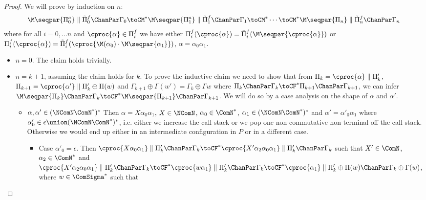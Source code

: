 \begin{proof}
We will prove by induction on $n$: 
$$\M\seqpar{\Pi^a_0} \parallel \tilde{\Pi}^f_0 \ChanPar \Gamma_0 \toCM^* \M\seqpar{\Pi^a_1} \parallel \tilde{\Pi}^f_1 \ChanPar \Gamma_1 \toCM^* \cdots \toCM^* \M\seqpar{\Pi_n} \parallel \tilde{\Pi}^f_n \ChanPar \Gamma_n$$
where for all $i = 0,\ldots n$ and $\cproc{\alpha} \in \Pi_i^f$ we have either $\Pi_i^f(\cproc{\alpha}) = \tilde{\Pi}^f_i(\M\seqpar{\cproc{\alpha}})$ or $\Pi_i^f(\cproc{\alpha}) = \tilde{\Pi}^f_i(\cproc{\M(\alpha_0) \cdot \M\seqpar{\alpha_1}})$, $\alpha = \alpha_0\alpha_1$.
\begin{itemize}
	\item $n = 0$. \newline
	The claim holds trivially.
	\item $n = k+1$, assuming the claim holds for $k$. \newline
	To prove the inductive claim we need to show that from
	$\Pi_k = \cproc{\alpha} \parallel \Pi'_k$, $\Pi_{k+1} =\cproc{\alpha'} \parallel \Pi'_k \oplus \Pi(w)$
	and
	$\Gamma_{k+1} \oplus \Gamma(w') = \Gamma_k \oplus \Gamma{w}$
	where $\Pi_k \ChanPar \Gamma_k \toCF^* \Pi_{k+1} \ChanPar \Gamma_{k+1}$,
	we can infer $\M\seqpar{\Pi_k} \ChanPar \Gamma_k \toCF^* \M\seqpar{\Pi_{k+1}} \ChanPar \Gamma_{k+1}$.
	We will do so by a case analysis on the shape of $\alpha$ and $\alpha'$.
	\begin{itemize}
		\item $\alpha, \alpha' \in (\NComN\ComN^*)^*$ \newline
		Then $\alpha = X\alpha_0\alpha_1$, $X \in \NComN$, $\alpha_0 \in \ComN^*$, 
		$\alpha_1 \in (\NComN\ComN^*)^*$ and $\alpha' = \alpha'_0\alpha_1$ where $\alpha'_0 \in \epsilon \union (\NComN\ComN^*)^*$, i.e. either we increase the call-stack or we pop one non-commutative non-terminal off the call-stack. Otherwise we would end up either in an intermediate configuration in $P$ or in a different case.
		\begin{itemize}
			\item Case $\alpha'_0 = \epsilon$.\newline
			Then $\cproc{X\alpha_0\alpha_1} \parallel \Pi'_k \ChanPar \Gamma_k \toCF^* 
				\cproc{X'\alpha_2\alpha_0\alpha_1} \parallel \Pi'_k \ChanPar \Gamma_k$ such that 
				${X' \in \ComN}$, $\alpha_2 \in \ComN^*$ and 
				$\cproc{X'\alpha_2\alpha_0\alpha_1} \parallel \Pi'_k \ChanPar \Gamma_k \toCF^*
					\cproc{w\alpha_1} \parallel \Pi'_k \ChanPar \Gamma_k \toCF^* 
					\cproc{\alpha_1} \parallel \Pi'_k \oplus \Pi(w) \ChanPar \Gamma_k \oplus \Gamma(w)$, where $w \in \ComSigma^*$ such that 

\end{itemize}
\end{itemize}
\end{itemize}
\end{proof}
